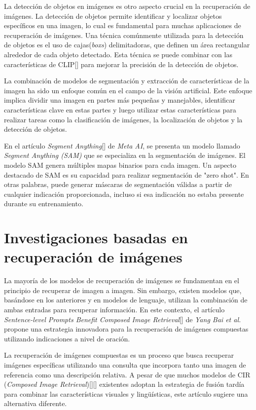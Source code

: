 La detección de objetos en imágenes es otro aspecto crucial en la recuperación de imágenes. La detección de objetos permite identificar y localizar objetos específicos en una imagen, lo cual es fundamental para muchas aplicaciones de recuperación de imágenes. Una técnica comúnmente utilizada para la detección de objetos es el uso de cajas(\textit{boxs}) delimitadoras, que definen un área rectangular alrededor de cada objeto detectado. Esta técnica se puede combinar con las características de CLIP[\cite{clip}] para mejorar la precisión de la detección de objetos.

La combinación de modelos de segmentación y extracción de características de la imagen ha sido un enfoque común en el campo de la visión artificial. Este enfoque implica dividir una imagen en partes más pequeñas y manejables, identificar características clave en estas partes y luego utilizar estas características para realizar tareas como la clasificación de imágenes, la localización de objetos y la detección de objetos.

En el artículo \textit{Segment Anything}[\cite{sam-paper}] de \textit{Meta AI}, se presenta un modelo llamado \textit{Segment Anything (SAM)} que se especializa en la segmentación de imágenes. El modelo SAM genera múltiples mapas binarios para cada imagen. Un aspecto destacado de SAM es su capacidad para realizar segmentación de "zero shot". En otras palabras, puede generar máscaras de segmentación válidas a partir de cualquier indicación proporcionada, incluso si esa indicación no estaba presente durante su entrenamiento. 

\section{Investigaciones basadas en recuperaci\'on de im\'agenes}

La mayoría de los modelos de recuperación de imágenes se fundamentan en el principio de recuperar de imagen a imagen. Sin embargo, existen modelos que, basándose en los anteriores y en modelos de lenguaje, utilizan la combinación de ambas entradas para recuperar información. En este contexto, el artículo \textit{Sentence-level Prompts Benefit Composed Image Retrieval}[\cite{sentence-level}] de \textit{Yang Bai et al.} propone una estrategia innovadora para la recuperación de imágenes compuestas utilizando indicaciones a nivel de oración.

La recuperación de imágenes compuestas es un proceso que busca recuperar imágenes específicas utilizando una consulta que incorpora tanto una imagen de referencia como una descripción relativa. A pesar de que muchos modelos de CIR (\textit{Composed Image Retrieval})[\cite{CBIR-DeepLearning}][\cite{embedding2}] existentes adoptan la estrategia de fusión tardía para combinar las características visuales y lingüísticas, este artículo sugiere una alternativa diferente.

